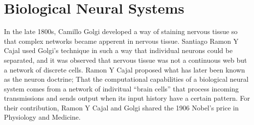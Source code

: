 
% 







\section{Biological Neural Systems}
\label{secBiologicalNeuralSystems}	
	In the late 1800s, Camillo Golgi developed a way of staining nervous tissue so that complex networks became apperent in nervous tissue.
	Santiago Ramon Y Cajal used Golgi's technique in such a way that individual neurons could be separated, and it was observed that nervous tissue was not a continuous web but a network of discrete cells. 
	Ramon Y Cajal proposed what has later been known as the neuron doctrine; 
		That the computational capabilities of a biological neural system comes from a network of indivitual ``brain cells'' that process incoming transmissions and sends output when its input history have a certain pattern.
	For their contribution, Ramon Y Cajal and Golgi shared the 1906 Nobel's price in Physiology and Medicine.
	\cite{NeuroscienceExploringTheBrain3edKAP2}

